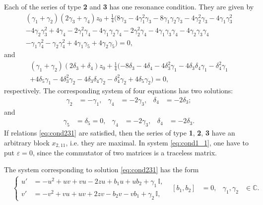 \documentclass{article}
\theoremstyle{plain}
\newcommand{\LieBrackets}[1]{\left[ #1 \right]}
\begin{document}
Each of the series of type \textbf{2} and \textbf{3} has one resonance condition. They are given by
\begin{multline*}
    (\gamma_1 + \gamma_2) (2 \gamma_3 + \gamma_4) z_0
    + \frac{1}{4} (8 \gamma_3 
    - 4 \gamma_1^2 \gamma_3 
    - 8 \gamma_1 \gamma_2 \gamma_3 
    - 4 \gamma_2^2 \gamma_3 
    - 4 \gamma_1 \gamma_3^2 
    \\
    - 4 \gamma_2 \gamma_3^2 
    + 4 \gamma_4 
    - 2 \gamma_1^2 \gamma_4 
    - 4 \gamma_1 \gamma_2 \gamma_4 
    - 2 \gamma_2^2 \gamma_4 
    - 4 \gamma_1 \gamma_3 \gamma_4 
    - 4 \gamma_2 \gamma_3 \gamma_4 
    \\
    - \gamma_1 \gamma_4^2 
    - \gamma_2 \gamma_4^2 
    + 4 \gamma_1 \gamma_5 
    + 4 \gamma_2 \gamma_5)
    = 0,
\end{multline*}
and 
\begin{multline*}
    (\gamma_1 + \gamma_2) (2 \delta_3 + \delta_4) z_0
    + \frac{1}{4} (-8 \delta_3 
    - 4 \delta_4 
    - 4 \delta_3^2 \gamma_1 
    - 4 \delta_3 \delta_4 \gamma_1 
    - \delta_4^2 \gamma_1 
    \\
    + 4 \delta_5 \gamma_1 
    - 4 \delta_3^2 \gamma_2 
    - 4 \delta_3 \delta_4 \gamma_2 
    - \delta_4^2 \gamma_2 
    + 4 \delta_5 \gamma_2)
    = 0,
\end{multline*}
respectively. The corresponding system of four equations has two solutions:
\begin{align} \label{eq:cond231}
    \gamma_2
    &= - \gamma_1,
    &
    \gamma_4
    &= - 2 \gamma_3,
    &
    \delta_4
    &= - 2 \delta_3;
\end{align}
and
\begin{align} \label{eq:cond232}
    \gamma_5
    &= \delta_5 = 0,
    &
    \gamma_4
    &= - 2 \gamma_3,
    &
    \delta_4
    &= - 2 \delta_3.
\end{align}
If relations \eqref{eq:cond231} are satisfied, then the series of type \textbf{1}, \textbf{2}, \textbf{3} have an arbitrary block $x_{2, 11}$, i.e. they are maximal. In system \eqref{eq:cond1_1}, one have to put $\varepsilon = 0$, since the commutator of two matrices is a traceless matrix.

The system corresponding to solution \eqref{eq:cond231} has the form 
\begin{align} \label{eq:case1tail}
    &
    \left\{
    \begin{aligned}
    u'
    &= - u^2 + u v + v u - 2 z u + b_1 u + u b_2 + \gamma_1 \, \mathbb{I},
    \\
    v'
    &= - v^2 + v u + u v + 2 z v - b_2 v - v b_1 + \gamma_2 \, \mathbb{I},
    \end{aligned}
    \right.
    &
    \LieBrackets{b_1, b_2}
    &= 0,
    &
    \gamma_1, \gamma_2 
    &\in \mathbb{C}.
\end{align}
\end{document}
